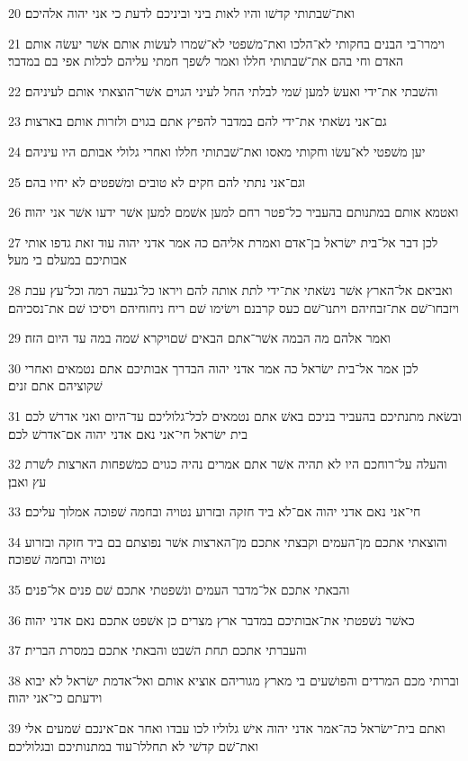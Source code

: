 \par 20 ואת־שׁבתותי קדשׁו והיו לאות ביני וביניכם לדעת כי אני יהוה אלהיכם׃
\par 21 וימרו־בי הבנים בחקותי לא־הלכו ואת־משׁפטי לא־שׁמרו לעשׂות אותם אשׁר יעשׂה אותם האדם וחי בהם את־שׁבתותי חללו ואמר לשׁפך חמתי עליהם לכלות אפי בם במדבר׃
\par 22 והשׁבתי את־ידי ואעשׂ למען שׁמי לבלתי החל לעיני הגוים אשׁר־הוצאתי אותם לעיניהם׃
\par 23 גם־אני נשׂאתי את־ידי להם במדבר להפיץ אתם בגוים ולזרות אותם בארצות׃
\par 24 יען משׁפטי לא־עשׂו וחקותי מאסו ואת־שׁבתותי חללו ואחרי גלולי אבותם היו עיניהם׃
\par 25 וגם־אני נתתי להם חקים לא טובים ומשׁפטים לא יחיו בהם׃
\par 26 ואטמא אותם במתנותם בהעביר כל־פטר רחם למען אשׁמם למען אשׁר ידעו אשׁר אני יהוה׃
\par 27 לכן דבר אל־בית ישׂראל בן־אדם ואמרת אליהם כה אמר אדני יהוה עוד זאת גדפו אותי אבותיכם במעלם בי מעל׃
\par 28 ואביאם אל־הארץ אשׁר נשׂאתי את־ידי לתת אותה להם ויראו כל־גבעה רמה וכל־עץ עבת ויזבחו־שׁם את־זבחיהם ויתנו־שׁם כעס קרבנם וישׂימו שׁם ריח ניחוחיהם ויסיכו שׁם את־נסכיהם׃
\par 29 ואמר אלהם מה הבמה אשׁר־אתם הבאים שׁםויקרא שׁמה במה עד היום הזה׃
\par 30 לכן אמר אל־בית ישׂראל כה אמר אדני יהוה הבדרך אבותיכם אתם נטמאים ואחרי שׁקוציהם אתם זנים׃
\par 31 ובשׂאת מתנתיכם בהעביר בניכם באשׁ אתם נטמאים לכל־גלוליכם עד־היום ואני אדרשׁ לכם בית ישׂראל חי־אני נאם אדני יהוה אם־אדרשׁ לכם׃
\par 32 והעלה על־רוחכם היו לא תהיה אשׁר אתם אמרים נהיה כגוים כמשׁפחות הארצות לשׁרת עץ ואבן׃
\par 33 חי־אני נאם אדני יהוה אם־לא ביד חזקה ובזרוע נטויה ובחמה שׁפוכה אמלוך עליכם׃
\par 34 והוצאתי אתכם מן־העמים וקבצתי אתכם מן־הארצות אשׁר נפוצתם בם ביד חזקה ובזרוע נטויה ובחמה שׁפוכה׃
\par 35 והבאתי אתכם אל־מדבר העמים ונשׁפטתי אתכם שׁם פנים אל־פנים׃
\par 36 כאשׁר נשׁפטתי את־אבותיכם במדבר ארץ מצרים כן אשׁפט אתכם נאם אדני יהוה׃
\par 37 והעברתי אתכם תחת השׁבט והבאתי אתכם במסרת הברית׃
\par 38 וברותי מכם המרדים והפושׁעים בי מארץ מגוריהם אוציא אותם ואל־אדמת ישׂראל לא יבוא וידעתם כי־אני יהוה׃
\par 39 ואתם בית־ישׂראל כה־אמר אדני יהוה אישׁ גלוליו לכו עבדו ואחר אם־אינכם שׁמעים אלי ואת־שׁם קדשׁי לא תחללו־עוד במתנותיכם ובגלוליכם׃
